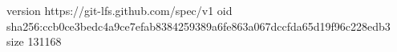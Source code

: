 version https://git-lfs.github.com/spec/v1
oid sha256:ccb0ce3bedc4a9ce7efab8384259389a6fe863a067dccfda65d19f96c228edb3
size 131168
